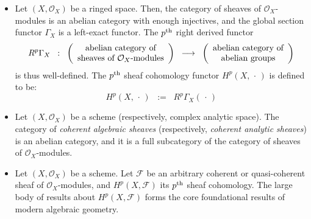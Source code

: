 \begin{itemize}
\item
	Let $(X,\mathcal{O}_{X})$ be a ringed space.
	Then, the category of sheaves of $\mathcal{O}_{X}$-modules
	is an abelian category with enough injectives, and
	the global section functor $\Gamma_{X}$ is a left-exact functor.
	The $p^{\textnormal{th}}$ right derived functor
	\begin{equation*}
	R^{p}\Gamma_{X}
	\;\; : \;\;
	\left(\begin{array}{c} \textnormal{abelian category of} \\ \textnormal{sheaves of $\mathcal{O}_{X}$-modules} \end{array}\right)
	\;\;\longrightarrow\;\;
	\left(\begin{array}{c} \textnormal{abelian category of} \\ \textnormal{abelian groups} \end{array}\right)
	\end{equation*}
	is thus well-defined.
	The $p^{\textnormal{th}}$ sheaf cohomology functor $H^{p}(X,\,\cdot\,)$ is defined to be:
	\begin{equation*}
	H^{p}(X,\,\cdot\,)
	\;\; := \;\;
		R^{p}\Gamma_{X}(\,\cdot\,)
	\end{equation*}
\item
	Let $(X,\mathcal{O}_{X})$ be a scheme (respectively, complex analytic space).
	The category of \textit{coherent algebraic sheaves} (respectively, \textit{coherent analytic sheaves})
	is an abelian category, and it is a full subcategory of the category of sheaves of $\mathcal{O}_{X}$-modules.
\item
	Let $(X,\mathcal{O}_{X})$ be a scheme.
	Let $\mathcal{F}$ be an arbitrary coherent or quasi-coherent sheaf of $\mathcal{O}_{X}$-modules,
	and $H^{p}(X,\mathcal{F})$ its $p^{\textnormal{th}}$ sheaf cohomology.
	The large body of results about $H^{p}(X,\mathcal{F})$ forms the core foundational results of modern algebraic geometry.
\end{itemize}


